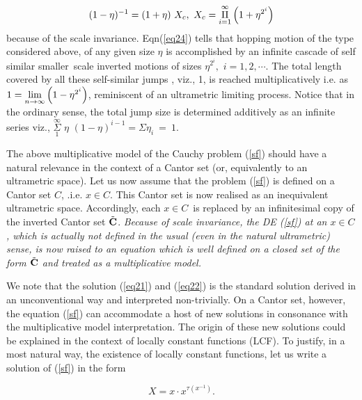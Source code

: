 \documentclass[12pt]{article}
\begin{document}
\begin{equation}\label{eq24}
(1-\eta )^{-1}=(1+\eta )\text{ }{X}_{c},\text{ } X_{c}=\underset{i=1}{%
\overset{\infty }{\Pi }}\left( 1+\eta ^{2^{i}}\right)
\end{equation}%
\noindent because of the scale invariance. Eqn(\ref{eq24}) tells that hopping motion of the type considered above, of any given size $\eta $ is accomplished by an infinite
cascade of self similar smaller\ scale inverted motions of  sizes $\eta
^{2^{i}},$ $i=1,2,\cdots $. The total length covered by all these
self-similar jumps , viz., 1, is reached multiplicatively i.e. as $1=\underset{%
n\rightarrow \infty }{\lim }\left( 1-\eta ^{2^{i}}\right) $, reminiscent of
an ultrametric limiting process. Notice that in the ordinary sense, the
total jump size is determined additively as an infinite series viz., $%
\underset{1}{\overset{\infty }{\Sigma }}$ $\eta $ $(1-\eta )^{i-1}= 
\Sigma \eta_i \ =\ 1.$

\vspace{.25cm}

The above multiplicative model of the Cauchy problem (\ref{sf}) should have a
natural relevance in the context of a Cantor set (or, equivalently to an
ultrametric  space). Let us now assume that the problem (\ref{sf}) is
defined on a Cantor set $C$, .i.e. $x\in C$. This Cantor set is now realised as an
inequivalent ultrametric space. Accordingly, each $x\in C$\  is replaced by an
infinitesimal copy of the inverted Cantor set $\tilde{\bf C}$. {\em Because of scale
invariance, the DE (\ref{sf}) at an $x\in C$, which is actually not defined in the usual 
(even in the natural ultrametric) sense,  
is now raised to an equation which is well defined on a closed set of the form $\tilde{\bf C}$ and treated as a multiplicative model.}

\vspace{.25cm}

We note that the solution (\ref{eq21}) and (\ref{eq22}) is the standard solution derived in an unconventional way and interpreted non-trivially. On a Cantor set,
however, the equation (\ref{sf}) can accommodate a host of new solutions in
consonance with the multiplicative model interpretation. The origin of
these new solutions could be explained in the context of locally constant
functions (LCF). To justify, in a most natural way, the existence of  locally
constant functions, let us write a solution of (\ref{sf}) in the form

\begin{equation}\label{eq25}
X=x \cdot x^{\tau (x^{-1})}.
\end{equation}
\end{document}
